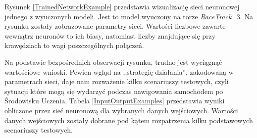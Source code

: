 Rysunek \ref{TrainedNetworkExample} przedstawia wizualizację sieci neuronowej jednego z wyuczonych modeli. Jest to model wyuczony na torze \textit{RaceTrack}\_3. Na rysunku zostały zobrazowane parametry sieci. Wartości liczbowe zawarte wewnątrz neuronów to ich biasy, natomiast liczby znajdujące się przy krawędziach to wagi poszczególnych połączeń.

Na podstawie bezpośrednich obserwacji rysunku, trudno jest wyciągnąć wartościowe wnioski. Pewien wgląd na ,,strategię działania'', zakodowaną w parametrach sieci, daje nam rozważenie kilku scenariuszy testowych, czyli sytuacji które mogą się wydarzyć podczas nawigowania samochodem po Środowisku Uczenia. Tabela \ref{InputOutputExamples} przedstawia wyniki obliczone przez sieć neuronową dla wybranych danych wejściowych. Wartości danych wejściowych zostały dobrane pod kątem rozpatrzenia kilku podstawowych scenariuszy testowych.

